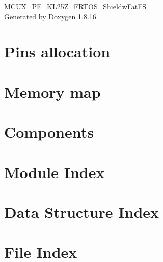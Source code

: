 \let\mypdfximage\pdfximage\def\pdfximage{\immediate\mypdfximage}\documentclass[twoside]{book}
\newcommand{\+}{\discretionary{\mbox{\scriptsize$\hookleftarrow$}}{}{}}
\newcommand{\clearemptydoublepage}{%
  \newpage{\pagestyle{empty}\cleardoublepage}%
}
\begin{document}
\hypersetup{pageanchor=false,
             bookmarksnumbered=true,
             pdfencoding=unicode
            }
\begin{titlepage}
\vspace*{7cm}
\begin{center}%
{\Large M\+C\+U\+X\+\_\+\+P\+E\+\_\+\+K\+L25\+Z\+\_\+\+F\+R\+T\+O\+S\+\_\+\+Shieldw\+Fat\+FS }\\
\vspace*{1cm}
{\large Generated by Doxygen 1.8.16}\\
\end{center}
\end{titlepage}
\clearemptydoublepage
{}
\tableofcontents
\clearemptydoublepage
{}
\hypersetup{pageanchor=true}

\chapter{Pins allocation}
\label{page_pinalloc}

\chapter{Memory map}
\label{page_memorymap}

\chapter{Components}
\label{page_components}

\chapter{Module Index}

\chapter{Data Structure Index}

\chapter{File Index}

\end{document}
